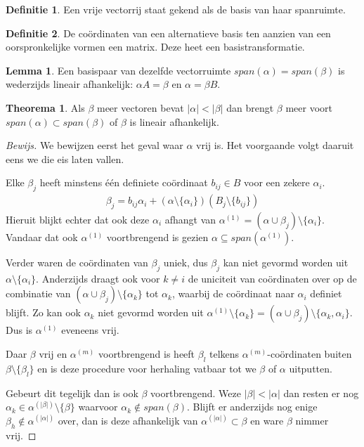\documentclass{amsart}
\theoremstyle{definition}
\newtheorem{thm}{Theorema}[section]
\newtheorem{lmm}{Lemma}[section]
\newtheorem{dfn}{Definitie}[section]
\newcommand{\abs}[1]{\lvert#1\rvert}
\newcommand{\without}[1]{\setminus\{#1\}}
\newenvironment{bewijs}{\begin{proof}[Bewijs]}{\end{proof}}
\begin{document}
\begin{dfn}
	Een vrije vectorrij staat gekend als de basis van haar spanruimte.
\end{dfn}

\begin{dfn}
	De coördinaten van een alternatieve basis ten aanzien van een oorspronkelijke vormen een matrix.
	Deze heet een basistransformatie.
\end{dfn}

\begin{lmm}
	Een basispaar van dezelfde vectorruimte $span(\alpha) = span(\beta)$ is wederzijds lineair afhankelijk: $\alpha A = \beta$ en $\alpha = \beta B$.
\end{lmm}

\begin{thm}
	Als $\beta$ meer vectoren bevat $\abs\alpha < \abs\beta$ dan brengt $\beta$ meer voort $span(\alpha) \subset span(\beta)$ of $\beta$ is lineair afhankelijk.
	\begin{bewijs}
		We bewijzen eerst het geval waar $\alpha$ vrij is. Het voorgaande volgt daaruit eens we die eis laten vallen.

		Elke $\beta_j$ heeft minstens één definiete coördinaat $b_{ij} \in B$ voor een zekere $\alpha_i$.
		\begin{align*}
			\beta_j = b_{ij}\alpha_i + (\alpha \without{\alpha_i})(B_j  \without{b_{ij}}) 
		\end{align*}
		Hieruit blijkt echter dat ook deze $\alpha_i$ afhangt van  $\alpha^{(1)} = (\alpha \cup \beta_j) \without{\alpha_i}$.
		Vandaar dat ook $\alpha^{(1)}$ voortbrengend is gezien $\alpha \subseteq span(\alpha^{(1)})$.

		Verder waren de coördinaten van $\beta_j$ uniek, dus $\beta_j$ kan niet gevormd worden uit $\alpha \without {\alpha_i}$.
		Anderzijds draagt ook voor $k \neq i$ de uniciteit van coördinaten over op de combinatie van $(\alpha \cup \beta_j) \without{\alpha_k} $ tot $\alpha_k$,
		waarbij de coördinaat naar $\alpha_i$ definiet blijft.
		Zo kan ook $\alpha_k$ niet gevormd worden uit $\alpha^{(1)} \without{\alpha_k} = (\alpha \cup \beta_j) \without{\alpha_k, \alpha_i}$.
		Dus is $\alpha^{(1)}$ eveneens vrij.

		Daar $\beta$ vrij en $\alpha^{(m)}$ voortbrengend is heeft $\beta_l$ telkens $\alpha^{(m)}$-coördinaten buiten $\beta \without{\beta_l}$ en is deze procedure voor herhaling vatbaar tot we 
		$\beta$ of $\alpha$ uitputten.

		Gebeurt dit tegelijk dan is ook $\beta$ voortbrengend. Weze $\abs{\beta} < \abs{\alpha}$ dan resten er nog $\alpha_k \in \alpha^{(\abs{\beta})} \without{\beta}$ waarvoor $\alpha_k \notin span(\beta)$.
		Blijft er anderzijds nog enige $\beta_h \notin \alpha^{(\abs{\alpha})}$ over, dan is deze afhankelijk van $\alpha^{(\abs\alpha)} \subset \beta$ en ware $\beta$ nimmer vrij.
	\end{bewijs}
\end{thm}
\end{document}

